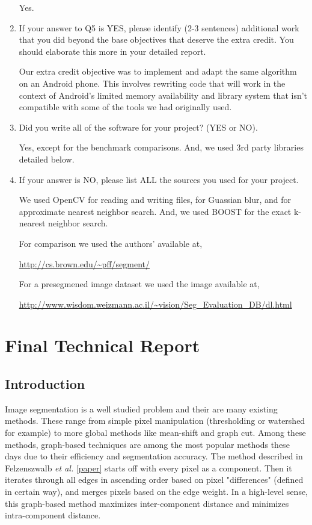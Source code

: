 \documentclass[12pt, english, titlepage]{article}
\begin{document}
\begin{enumerate}
Yes.

\item If your answer to Q5 is YES, please identify (2-3 sentences) additional work that you did beyond the base objectives that deserve the extra credit. You should elaborate this more in your detailed report.

Our extra credit objective was to implement and adapt the same algorithm on an Android phone. This involves rewriting code that will work in the context of Android's limited memory availability and library system that isn't compatible with some of the tools we had originally used.

\item Did you write all of the software for your project? (YES or NO).

Yes, except for the benchmark comparisons. And, we used 3rd party libraries detailed below.

\item If your answer is NO, please list ALL the sources you used for your project.

We used OpenCV for reading and writing files, for Guassian blur, and for approximate nearest neighbor search. And, we used BOOST for the exact k-nearest neighbor search.

For comparison we used the authors' available at,

\url{http://cs.brown.edu/~pff/segment/}

For a presegmened image dataset we used the image available at,

\url{http://www.wisdom.weizmann.ac.il/~vision/Seg_Evaluation_DB/dl.html}

\end{enumerate}


\section{Final Technical Report}

\subsection{Introduction}

Image segmentation is a well studied problem and their are many existing methods. These range from simple pixel manipulation (thresholding or watershed for example) to more global methods like mean-shift and graph cut.
	Among these methods, graph-based techniques are among the most popular methods these days due to their efficiency and segmentation accuracy. The method described in Felzenszwalb \emph{et al.} \ref{paper} starts off with every pixel as a component. Then it iterates through all edges in ascending order based on pixel "differences" (defined in certain way), and merges pixels based on the edge weight. In a high-level sense, this graph-based method maximizes inter-component distance and minimizes intra-component distance.
	
\end{document}
